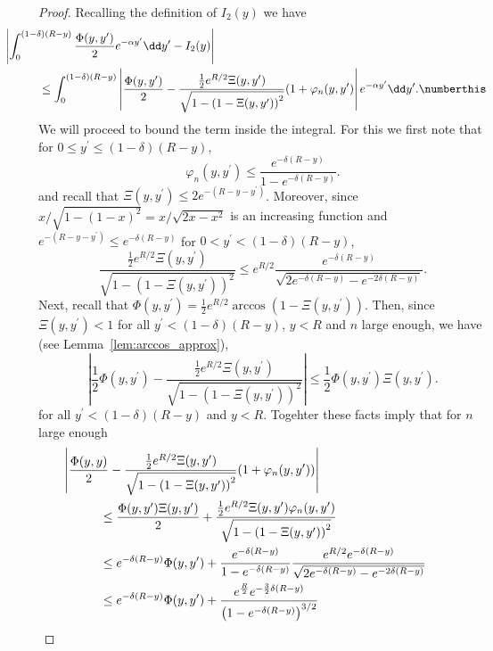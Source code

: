 \begin{proof}
Recalling the definition of $I_2(y)$ we have
\begin{align*}
	&\hspace{-30pt}\left|\int_0^{(1-\delta)(R- y)} \frac{\Phi(y,y^\prime)}{2} e^{-\alpha y^\prime} \dd y^\prime 
		- I_2(y)\right|\\
	&\le \int_0^{(1-\delta)(R- y)} \left|\frac{\Phi(y,y^\prime)}{2}- \frac{\frac{1}{2}e^{R/2} \Xi(y,y^\prime)}
		{\sqrt{1 - \left(1 - \Xi(y,y^\prime)\right)^2}}(1+\varphi_n(y,y^\prime)\right|e^{-\alpha y^\prime} \dd y^\prime.
		\numberthis \label{eq:derivative_hyp_ball_final_error}
\end{align*}
We will proceed to bound the term inside the integral. For this we first note that for $0 \le y^\prime \le (1-\delta)(R-y)$,
\[
	\varphi_n(y,y^\prime) \le \frac{e^{-\delta(R-y)}}{1 - e^{-\delta(R-y)}}.
\]
and recall that $\Xi(y,y^\prime) \le 2 e^{-(R-y-y^\prime)}$. Moreover, since $x/\sqrt{1-(1-x)^2} = x/\sqrt{2x-x^2}$ is an increasing function and $e^{-(R - y - y^\prime)} \le e^{-\delta(R- y)}$ for $0 < y^\prime < (1-\delta)(R-y)$,
\[
	\frac{\frac{1}{2}e^{R/2} \Xi(y,y^\prime)}{\sqrt{1 - \left(1 - \Xi(y,y^\prime)\right)^2}}
	\le e^{R/2} \frac{e^{-\delta(R-y)}}{\sqrt{2e^{-\delta(R-y)} - e^{-2\delta(R-y)}}}.
\]
Next, recall that $\Phi(y,y^\prime) = \frac{1}{2}e^{R/2}\arccos(1-\Xi(y,y^\prime))$. Then, since $\Xi(y,y^\prime) < 1$ for all $y^\prime < (1-\delta)(R-y)$, $y < R$ and $n$ large enough, we have (see Lemma~\ref{lem:arccos_approx}),
\[
	\left|\frac{1}{2}\Phi(y,y^\prime) - \frac{\frac{1}{2}e^{R/2} \Xi(y,y^\prime)}{\sqrt{1 - \left(1 - \Xi(y,y^\prime)\right)^2}}\right| \le \frac{1}{2}\Phi(y,y^\prime) \Xi(y,y^\prime).
\]
for all $y^\prime < (1-\delta)(R - y)$ and $y < R$. Togehter these facts imply that for $n$ large enough
\begin{align*}
	&\hspace{-30pt}\left|\frac{\Phi(y,y)}{2} - \frac{\frac{1}{2}e^{R/2} \Xi(y,y^\prime)}{\sqrt{1 - \left(1 - 	
		\Xi(y,y^\prime)\right)^2}}(1+\varphi_n(y,y^\prime))\right|\\
	&\le \frac{\Phi(y,y^\prime)\Xi(y,y^\prime)}{2} 
		+ \frac{\frac{1}{2}e^{R/2} \Xi(y,y^\prime) \varphi_n(y,y^\prime)}
		{\sqrt{1 - \left(1 - \Xi(y,y^\prime)\right)^2}} \\
	&\le e^{-\delta(R-y)} \Phi(y,y^\prime) + \frac{e^{-\delta(R-y)}}{1-e^{-\delta(R-y)}}
		\frac{e^{R/2} e^{-\delta(R-y)}}{\sqrt{2e^{-\delta(R-y)} - e^{-2\delta(R-y)}}}\\
	&\le e^{-\delta(R-y)} \Phi(y,y^\prime) + \frac{e^{\frac{R}{2}}e^{-\frac{3}{2}\delta(R-y)}}
		{\left(1 - e^{-\delta(R-y)}\right)^{3/2}}
\end{align*}


\end{proof}
